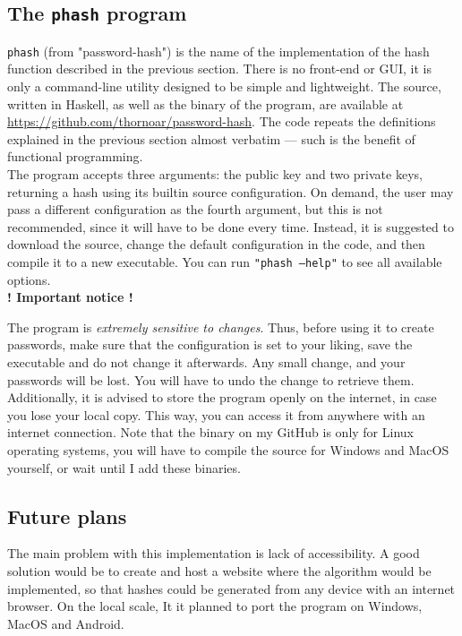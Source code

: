 \documentclass[12pt, a4paper]{article}
\begin{document}
\subsection{The \texttt{phash} program}

\texttt{phash} (from "password-hash") is the name of the implementation of the hash function described in the previous section. There is no front-end or GUI, it is only a command-line utility designed to be simple and lightweight. The source, written in Haskell, as well as the binary of the program, are available at \url{https://github.com/thornoar/password-hash}. The code repeats the definitions explained in the previous section almost verbatim --- such is the benefit of functional programming.\\

The program accepts three arguments: the public key and two private keys, returning a hash using its builtin source configuration. On demand, the user may pass a different configuration as the fourth argument, but this is not recommended, since it will have to be done every time. Instead, it is suggested to download the source, change the default configuration in the code, and then compile it to a new executable. You can run \texttt{"phash ---help"} to see all available options.\\

\textbf{! Important notice !}

The program is \emph{extremely sensitive to changes}. Thus, before using it to create passwords, make sure that the configuration is set to your liking, save the executable and do not change it afterwards. Any small change, and your passwords will be lost. You will have to undo the change to retrieve them. Additionally, it is advised to store the program openly on the internet, in case you lose your local copy. This way, you can access it from anywhere with an internet connection. Note that the binary on my GitHub is only for Linux operating systems, you will have to compile the source for Windows and MacOS yourself, or wait until I add these binaries.

\subsection{Future plans}

The main problem with this implementation is lack of accessibility. A good solution would be to create and host a website where the algorithm would be implemented, so that hashes could be generated from any device with an internet browser. On the local scale, It it planned to port the program on Windows, MacOS and Android.
\end{document}
